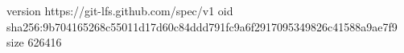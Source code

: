 version https://git-lfs.github.com/spec/v1
oid sha256:9b704165268c55011d17d60c84ddd791fc9a6f2917095349826c41588a9ae7f9
size 626416
